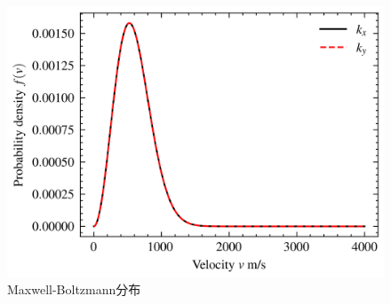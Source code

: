 \begin{figure}
    \includegraphics[keepaspectratio, width=0.8\linewidth]{src/figures/maxwell-boltzmann-distribution/maxwell-boltzmann-distribution.png}
    \caption{Maxwell-Boltzmann分布}\label{fig:maxwell-boltzmann-distribution}
\end{figure}
